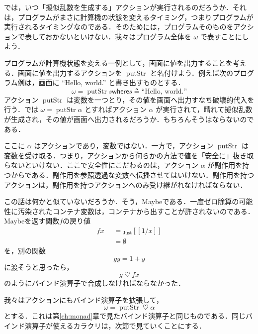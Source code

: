 \documentclass[a5paper,twoside,fleqn,draft]{jsbook}
\def\[{[\![}
\def\]{]\!]}
\newcommand{\mKeyword}[1]{\mathsf{#1}}
\newcommand{\mOtherwiseKeyword}{\mKeyword{otherwise}}
\newcommand{\mWhereKeyword}{\mKeyword{where}}
\DeclareMathOperator{\mOtherwise}{\mOtherwiseKeyword}
\newcommand{\mNothing}{\emptyset}
\newcommand{\mString}[1]{\text{#1}}
\newcommand{\mAction}[1]{\mathrm{#1}}
\DeclareMathOperator{\mPutStr}{\mAction{putStr}}
\DeclareMathOperator{\mBind}{\heartsuit}
\DeclareMathOperator{\mLetEq}{\triangleq}
\newcommand{\mValueConstructor}[1]{\mathrm{#1}}
\newcommand{\mValueWith}[2]{{}_\mValueConstructor{#1}\[#2\]}
\newcommand{\mJustWith}[1]{\mValueWith{Just}{#1}}
\newcommand{\mGuard}[1]{\mathop{\mid_{#1}}}
\newcommand{\mWhereIsEXP}[2]{\mathbin{\mWhereKeyword}#1\mLetEq#2} %
\begin{document}
では，いつ「擬似乱数を生成する」アクションが実行されるのだろうか．それは，プログラムがまさに計算機の状態を変えるタイミング，つまりプログラムが実行されるタイミングなのである．そのためには，プログラムそのものをアクションで表しておかないといけない．我々はプログラム全体を $\omega$ で表すことにしよう．

プログラムが計算機状態を変える一例として，画面に値を出力することを考える．画面に値を出力するアクションを $\mPutStr$ と名付けよう．例えば次のプログラム例は，画面に ``Hello, world.'' と書き出すものとする．
\begin{equation}
\omega=\mPutStr s\mWhereIsEXP{s}{\mString{``Hello, world.''}}
\end{equation}
アクション $\mPutStr$ は変数を一つとり，その値を画面へ出力すなち破壊的代入を行う．では $\omega=\mPutStr\alpha$ とすればアクション $\alpha$ が実行されて，晴れて擬似乱数が生成され，その値が画面へ出力されるだろうか．もちろんそうはならないのである．

ここに $\alpha$ はアクションであり，変数ではない．一方で，アクション $\mPutStr$ は変数を受け取る．つまり，アクションから何らかの方法で値を「安全に」抜き取らないといけない．ここで安全性にこだわるのは，アクション $\alpha$ が副作用を持つからである．副作用を参照透過な変数へ伝播させてはいけない．副作用を持つアクションは，副作用を持つアクションへのみ受け継がれなければならない．

この話は何かと似ていないだろうか．そう，Maybeである．一度ゼロ除算の可能性に汚染されたコンテナ変数は，コンテナから出すことが許されないのである．Maybeを返す関数$f$の戻り値
\begin{equation}
  \begin{aligned}
    fx&\mGuard{x\neq0}=\mJustWith{1/x}\\
    &\mGuard{\mOtherwise}=\mNothing
  \end{aligned}
\end{equation}
を，別の関数
\begin{equation}
  gy=1+y
\end{equation}
に渡そうと思ったら，
\begin{equation}
  g\mBind fx
\end{equation}
のようにバインド演算子で合成しなければならなかった．

我々はアクションにもバインド演算子を拡張して，
\begin{equation}
  \omega=\mPutStr\mBind\alpha
\end{equation}
とする．これは第\ref{ch:monad}章で見たバインド演算子と同じものである．同じバインド演算子が使えるカラクリは，次節で見ていくことにする．
\end{document}
